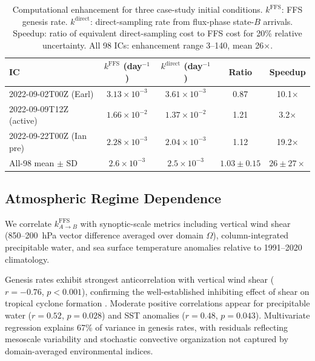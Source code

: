 \documentclass[11pt]{article}
\begin{document}
\begin{table}[htbp]
\centering
\caption{Computational enhancement for three case-study initial conditions. $k^{\text{FFS}}$: FFS genesis rate. $k^{\text{direct}}$: direct-sampling rate from flux-phase state-$B$ arrivals. Speedup: ratio of equivalent direct-sampling cost to FFS cost for 20\% relative uncertainty. All 98 ICs: enhancement range 3--140, mean 26$\times$.}
\label{tab:computational_cost}
\begin{tabular}{lcccc}
\toprule
IC & $k^{\text{FFS}}$ (day$^{-1}$) & $k^{\text{direct}}$ (day$^{-1}$) & Ratio & Speedup \\
\midrule
2022-09-02T00Z (Earl)    & $3.13\times10^{-3}$ & $3.61\times10^{-3}$ & 0.87 & 10.1$\times$ \\
2022-09-09T12Z (active)  & $1.66\times10^{-2}$ & $1.37\times10^{-2}$ & 1.21 &  3.2$\times$ \\
2022-09-22T00Z (Ian pre) & $2.28\times10^{-3}$ & $2.04\times10^{-3}$ & 1.12 & 19.2$\times$ \\
\midrule
All-98 mean $\pm$ SD & $2.6\times10^{-3}$ & $2.5\times10^{-3}$ & $1.03\pm0.15$ & $26\pm27\times$ \\
\bottomrule
\end{tabular}
\end{table}


\subsection{Atmospheric Regime Dependence}

We correlate $k_{A \to B}^{\text{FFS}}$ with synoptic-scale metrics including vertical wind shear (850--200~hPa vector difference averaged over domain $\Omega$), column-integrated precipitable water, and sea surface temperature anomalies relative to 1991--2020 climatology.

Genesis rates exhibit strongest anticorrelation with vertical wind shear ($r = -0.76$, $p < 0.001$), confirming the well-established inhibiting effect of shear on tropical cyclone formation \citep{gray1968global}. Moderate positive correlations appear for precipitable water ($r = 0.52$, $p = 0.028$) and SST anomalies ($r = 0.48$, $p = 0.043$). Multivariate regression explains 67\% of variance in genesis rates, with residuals reflecting mesoscale variability and stochastic convective organization not captured by domain-averaged environmental indices.
\end{document}

